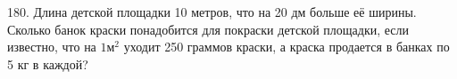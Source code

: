 180. Длина детской площадки 10 метров, что на 20 дм больше её ширины. Сколько банок краски понадобится для покраски детской площадки, если известно, что на $1\text{м}^2$ уходит 250 граммов краски, а краска продается в банках по 5 кг в каждой?\\
